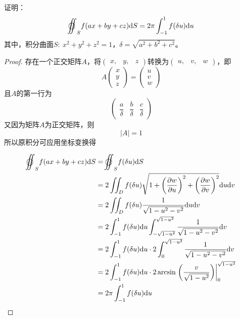 \begin{theorem}\label{theorem:surface}

    证明：
    $$\ooint_{S}{f(ax + by + cz)}\diff S = 2\pi\int_{-1}^{1}{f(\delta u)}\diff u$$
    其中，积分曲面$S:\ x^2 + y^2 + z^2 = 1$，$\delta = \sqrt{a^2 + b^2 + c^2}$。

\end{theorem}

\begin{proof}

    存在一个正交矩阵$A$，将$(\begin{smallmatrix} x,& y,& z \end{smallmatrix})$转换为$(\begin{smallmatrix} u,& v,& w \end{smallmatrix})$，即
    $$ A 
    \begin{pmatrix}
        x\\
        y\\
        z
    \end{pmatrix} = 
    \begin{pmatrix}
        u\\
        v\\
        w
    \end{pmatrix}$$
    且$A$的第一行为
    $$\begin{pmatrix}
        \dfrac{a}{\delta} & \dfrac{b}{\delta} & \dfrac{c}{\delta}
    \end{pmatrix}$$
    又因为矩阵$A$为正交矩阵，则
    $$|A| = 1$$
    所以原积分可应用坐标变换得
    
    \begin{align*}
        \ooint_{S}{f(ax + by + cz)}\diff S & = \ooint_{S}{f(\delta u)}\diff S \\
        & = 2\iint_{D}{f(\delta u) \sqrt{1 + \left( \dfrac{\partial w}{\partial u} \right)^2 + \left( \dfrac{\partial w}{\partial v}\right)^2}}\diff u \diff v\\
        & = 2\iint_{D}{f(\delta u) \dfrac{1}{\sqrt{1 - u^2 - v^2}}}\diff u \diff v \\
        & = 2\int_{-1}^{1}{f(\delta u)}\diff u \int_{-\sqrt{1 - u^2}}^{\sqrt{1 - u^2}}{\dfrac{1}{\sqrt{1 - u^2 - v^2}}}\diff v \\
        & = 2\int_{-1}^{1}{f(\delta u)}\diff u \cdot 2 \int_{0}^{\sqrt{1 - u^2}}{\dfrac{1}{\sqrt{1 - u^2 - v^2}}}\diff v \\
        & = 2\int_{-1}^{1}{f(\delta u)}\diff u \cdot 2\arcsin\left.\left(\dfrac{v}{\sqrt{1 - u^2}}\right) \right|_{0}^{\sqrt{1 - u^2}} \\
        & = 2\pi\int_{-1}^{1}{f(\delta u)}\diff u
    \end{align*}

\end{proof}

